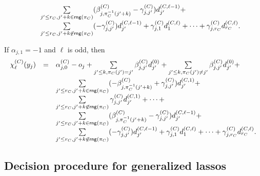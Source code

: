 \begin{itemize}
{\[\begin{array}{l c l}
%
& & \sum \limits_{j' \le r_C, j'+k \in \rng(\pi_C)} (\beta^{(C)}_{j, \pi_C^{-1}(j'+k)}-\gamma^{(C)}_{j,j'}) d^{(C,\ell-1)}_{j'} + \\
%
& & \sum \limits_{j' \le r_C,  j'+k \not \in \rng(\pi_C)} (-\gamma^{(C)}_{j,j'}) d^{(C,\ell-1)}_{j'} + \gamma^{(C)}_{j, 1} d^{(C,\ell)}_{1} + \dots + \gamma^{(C)}_{j,r_C} d^{(C,\ell)}_{r_C}.
\end{array} 
\]
\item If $\alpha_{j,1}=-1$ and $\ell$ is odd, then
\[
\begin{array}{l c l}
\smallskip
\chi^{(C)}_{\ell}(y_j)  & = &  \alpha^{(C)}_{j,0} - o_j + \sum \limits_{j' \le k, \pi_C(j')=j'} \beta^{(C)}_{j,j'} d^{(0)}_{j'} +  \sum \limits_{j'\le k, \pi_C(j') \neq j'}  \beta^{(C)}_{j,j'} d^{(0)}_{j'} +  \\
%
& & \sum \limits_{j' \le r_C, j'+k \in \rng(\pi_C)} ( -\beta^{(C)}_{j, \pi_C^{-1}(j'+k)} +\gamma^{(C)}_{j,j'}) d^{(C,1)}_{j'} + \\
%
& & \sum \limits_{j' \le r_C,  j'+k \not \in \rng(\pi_C)} \gamma^{(C)}_{j,j'} d^{(C,1)}_{j'} + \dots + \\
%
& & \sum \limits_{j' \le r_C, j'+k \in \rng(\pi_C)} (\beta^{(C)}_{j, \pi_C^{-1}(j'+k)}-\gamma^{(C)}_{j,j'}) d^{(C,\ell-1)}_{j'} + \\
%
& & \sum \limits_{j' \le r_C,  j'+k \not \in \rng(\pi_C)} (-\gamma^{(C)}_{j,j'}) d^{(C,\ell-1)}_{j'} + \gamma^{(C)}_{j, 1} d^{(C,\ell)}_{1} + \dots + \gamma^{(C)}_{j,r_C} d^{(C,\ell)}_{r_C}.
\end{array} 
\]
}
\end{itemize}
%
%
%
%


\subsection{Decision procedure for generalized lassos}\label{sec-glasso}

